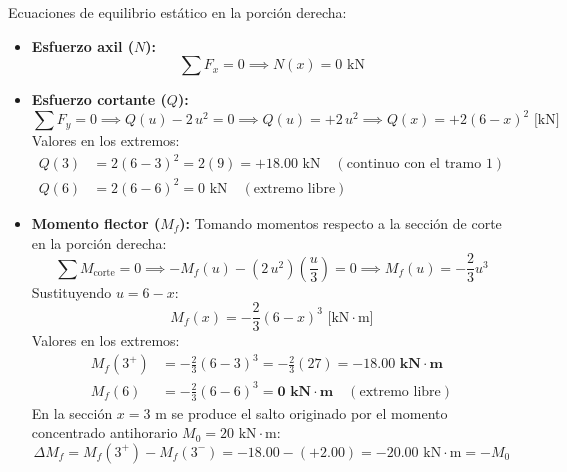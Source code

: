Ecuaciones de equilibrio estático en la porción derecha:
\begin{itemize}
    \item \textbf{Esfuerzo axil ($N$):}
          \begin{equation}
              \sum F_x = 0 \implies \boxed{N(x) = 0\text{ kN}}
          \end{equation}

    \item \textbf{Esfuerzo cortante ($Q$):}
          \begin{equation}
              \sum F_y = 0 \implies Q(u) - 2\,u^2 = 0 \implies Q(u) = +2\,u^2 \implies \boxed{Q(x) = +2(6 - x)^2\text{ [kN]}}
          \end{equation}
          Valores en los extremos:
          \begin{align*}
              Q(3) & = 2(6 - 3)^2 = 2(9) = +18.00\text{ kN} \quad (\text{continuo con el tramo 1}) \\
              Q(6) & = 2(6 - 6)^2 = 0\text{ kN} \quad (\text{extremo libre})
          \end{align*}

    \item \textbf{Momento flector ($M_f$):}
          Tomando momentos respecto a la sección de corte en la porción derecha:
          \begin{equation}
              \sum M_{\text{corte}} = 0 \implies -M_f(u) - (2\,u^2)\left(\frac{u}{3}\right) = 0 \implies M_f(u) = -\frac{2}{3}u^3
          \end{equation}
          Sustituyendo $u = 6 - x$:
          \begin{equation}
              \boxed{M_f(x) = -\frac{2}{3}(6 - x)^3\text{ [kN}\cdot\text{m]}}
          \end{equation}
          Valores en los extremos:
          \begin{align*}
              M_f(3^+) & = -\frac{2}{3}(6 - 3)^3 = -\frac{2}{3}(27) = \mathbf{-18.00\text{ kN}\cdot\text{m}}      \\
              M_f(6)   & = -\frac{2}{3}(6 - 6)^3 = \mathbf{0\text{ kN}\cdot\text{m}} \quad (\text{extremo libre})
          \end{align*}
          En la sección $x = 3\text{ m}$ se produce el salto originado por el momento concentrado antihorario $M_0 = 20\text{ kN}\cdot\text{m}$:
          \begin{equation}
              \Delta M_f = M_f(3^+) - M_f(3^-) = -18.00 - (+2.00) = -20.00\text{ kN}\cdot\text{m} = -M_0
          \end{equation}
\end{itemize}

